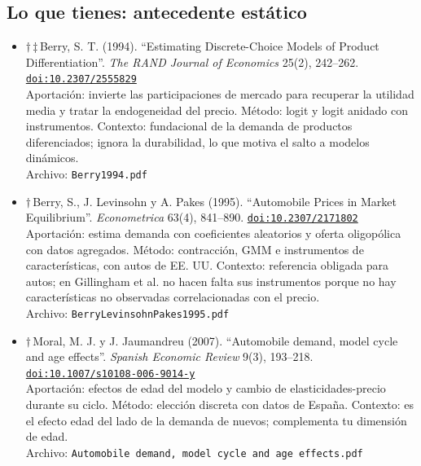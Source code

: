 \documentclass[11pt]{article}
\begin{document}
\subsection*{Lo que tienes: antecedente estático}
\begin{itemize}
\item $\dagger$\,$\ddagger$\,Berry, S. T. (1994). ``Estimating Discrete-Choice Models of Product Differentiation''. \textit{The RAND Journal of Economics} 25(2), 242--262. \href{https://doi.org/10.2307/2555829}{\texttt{doi:10.2307/2555829}}\\
Aportación: invierte las participaciones de mercado para recuperar la utilidad media y tratar la endogeneidad del precio. Método: logit y logit anidado con instrumentos. Contexto: fundacional de la demanda de productos diferenciados; ignora la durabilidad, lo que motiva el salto a modelos dinámicos.\\
{\footnotesize Archivo: \texttt{Berry1994.pdf}}
\item $\dagger$\,Berry, S., J. Levinsohn y A. Pakes (1995). ``Automobile Prices in Market Equilibrium''. \textit{Econometrica} 63(4), 841--890. \href{https://doi.org/10.2307/2171802}{\texttt{doi:10.2307/2171802}}\\
Aportación: estima demanda con coeficientes aleatorios y oferta oligopólica con datos agregados. Método: contracción, GMM e instrumentos de características, con autos de EE. UU. Contexto: referencia obligada para autos; en Gillingham et al. no hacen falta sus instrumentos porque no hay características no observadas correlacionadas con el precio.\\
{\footnotesize Archivo: \texttt{BerryLevinsohnPakes1995.pdf}}
\item $\dagger$\,Moral, M. J. y J. Jaumandreu (2007). ``Automobile demand, model cycle and age effects''. \textit{Spanish Economic Review} 9(3), 193--218. \href{https://doi.org/10.1007/s10108-006-9014-y}{\texttt{doi:10.1007/s10108-006-9014-y}}\\
Aportación: efectos de edad del modelo y cambio de elasticidades-precio durante su ciclo. Método: elección discreta con datos de España. Contexto: es el efecto edad del lado de la demanda de nuevos; complementa tu dimensión de edad.\\
{\footnotesize Archivo: \texttt{Automobile demand, model cycle and age effects.pdf}}
\end{itemize}
\end{document}
